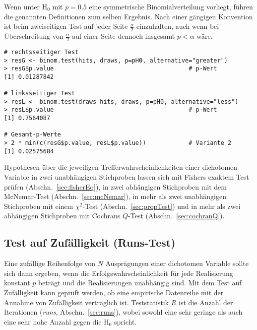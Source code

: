 Wenn unter $\text{H}_{0}$ mit $p=0.5$ eine symmetrische Binomialverteilung vorliegt, führen die genannten Definitionen zum selben Ergebnis. Nach einer gängigen Konvention ist beim zweiseitigen Test auf jeder Seite $\frac{\alpha}{2}$ einzuhalten, auch wenn bei Überschreitung von $\frac{\alpha}{2}$ auf einer Seite dennoch insgesamt $p < \alpha$ wäre.
\begin{lstlisting}
# rechtsseitiger Test
> resG <- binom.test(hits, draws, p=pH0, alternative="greater")
> resG$p.value                                      # p-Wert
[1] 0.01287842

# linksseitiger Test
> resL <- binom.test(draws-hits, draws, p=pH0, alternative="less")
> resL$p.value                                      # p-Wert
[1] 0.7564087

# Gesamt-p-Werte
> 2 * min(c(resG$p.value, resL$p.value))            # Variante 2
[1] 0.02575684
\end{lstlisting}

Hypothesen über die jeweiligen Trefferwahrscheinlichkeiten einer dichotomen Variable in zwei unabhängigen Stichproben lassen sich mit Fishers exaktem Test prüfen (Abschn.\ \ref{sec:fisherEq}), in zwei abhängigen Stichproben mit dem McNemar-Test (Abschn.\ \ref{sec:mcNemar}), in mehr als zwei unabhängigen Stichproben mit einem $\chi^{2}$-Test (Abschn.\ \ref{sec:propTest}) und in mehr als zwei abhängigen Stichproben mit Cochrans $Q$-Test (Abschn.\ \ref{sec:cochranQ}).

\subsection{Test auf Zufälligkeit (Runs-Test)}
\label{sec:runsTest}

Eine zufällige Reihenfolge von $N$ Ausprägungen einer dichotomen Variable sollte sich dann ergeben, wenn die Erfolgswahrscheinlichkeit für jede Realisierung konstant $p$ beträgt und die Realisierungen unabhängig sind. Mit dem Test auf Zufälligkeit kann geprüft werden, ob eine empirische Datenreihe mit der Annahme von Zufälligkeit verträglich ist. Teststatistik $R$ ist die Anzahl der Iterationen (\emph{runs}, Abschn.\ \ref{sec:runs}), wobei sowohl eine sehr geringe als auch eine sehr hohe Anzahl gegen die $\text{H}_{0}$ spricht.

